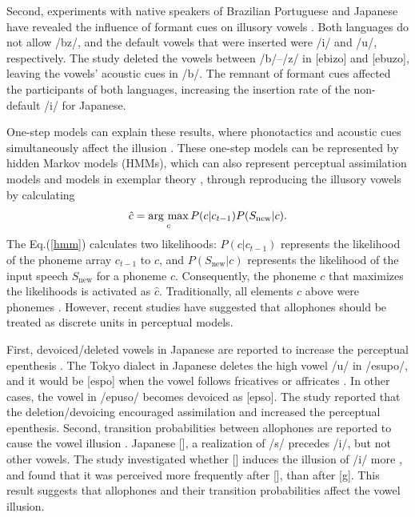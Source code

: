 \documentclass[a4paper,11pt,twocolumn]{article}
\newcommand{\argmax}{\mathop{\rm arg~max}\limits}
\begin{document}
Second, experiments with native speakers of Brazilian Portuguese and Japanese have revealed the influence of formant cues on illusory vowels \cite{dupoux2011illusory}. Both languages do not allow /bz/, and the default vowels that were inserted were /i/ and /u/, respectively. The study deleted the vowels between /b/--/z/ in [ebizo] and [ebuzo], leaving the vowels' acoustic cues in /b/. The remnant of formant cues affected the participants of both languages, increasing the insertion rate of the non-default /i/ for Japanese.

One-step models can explain these results, where phonotactics and acoustic cues simultaneously affect the illusion \cite{dupoux2011illusory}. These one-step models can be represented by hidden Markov models (HMMs), which can also represent perceptual assimilation models \cite{best2001discrimination} and models in exemplar theory \cite{lacerda1995perceptual}, through reproducing the illusory vowels \cite{kishiyama2021influence} by calculating
\begin{equation} \label{hmm}
    \hat{c} = \argmax_{c} P(c | c_{t-1})P(S_{\text{new}}|c).
\end{equation}
The Eq.(\ref{hmm}) calculates two likelihoods: $P(c|c_{t-1})$ represents the likelihood of the phoneme array $c_{t-1}$ to $c$, and $P(S_{\text{new}}|c)$ represents the likelihood of the input speech $S_{\text{new}}$ for a phoneme $c$. Consequently, the phoneme $c$ that maximizes the likelihoods is activated as $\hat{c}$.
Traditionally, all elements $c$ above were phonemes \cite{wilson2013bayesian}. However, recent studies have suggested that allophones should be treated as discrete units in perceptual models.

First, devoiced/deleted vowels in Japanese are reported to increase the perceptual epenthesis \cite{kilpatrick2018japanese}. The Tokyo dialect in Japanese deletes the high vowel /u/ in /esupo/, and it would be [espo] when the vowel follows fricatives or affricates \cite{fujimoto2003devoice_eng, shaw2018lingual}. In other cases, the vowel in /epuso/ becomes devoiced as [ep\textsubring{\textturnm}so]. The study reported that the deletion/devoicing encouraged assimilation and increased the perceptual epenthesis. Second, transition probabilities between allophones are reported to cause the vowel illusion \cite{kilpatrick2020japanese}. Japanese [\textctc], a realization of /s/ precedes /i/, but not other vowels. The study investigated whether [\textctc{}] induces the illusion of /i/ more \cite{kilpatrick2020japanese}, and found that it was perceived more frequently after [\textctc], than after [g]. This result suggests that allophones and their transition probabilities affect the vowel illusion.
\end{document}
